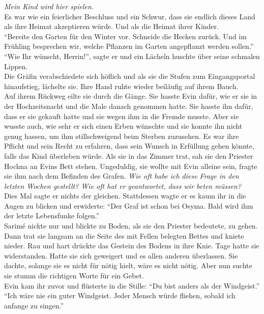 \textit{Mein Kind wird hier spielen.}\\
Es war wie ein feierlicher Beschluss und ein Schwur, dass sie endlich dieses Land als ihre Heimat 
akzeptieren würde. Und als die Heimat ihrer Kinder.\\
``Bereite den Garten für den Winter vor. Schneide die Hecken zurück. Und im Frühling besprechen 
wir, welche Pflanzen im Garten angepflanzt werden sollen.''\\
``Wie Ihr wünscht, Herrin!'', sagte er und ein Lächeln huschte über seine schmalen Lippen.\\
Die Gräfin verabschiedete sich höflich und als sie die Stufen zum Eingangsportal hinaufstieg, 
lächelte sie. Ihre Hand ruhte wieder beiläufig auf ihrem Bauch. \\

Auf ihrem Rückweg eilte sie durch die Gänge. Sie hasste Evin dafür, wie er sie in der 
Hochzeitsnacht und die Male danach genommen hatte. Sie hasste ihn dafür, dass er sie gekauft hatte 
und sie wegen ihm in die Fremde musste. Aber sie wusste auch, wie sehr er sich einen Erben wünschte 
und sie konnte ihn nicht genug hassen, um ihm stillschweigend beim Sterben zuzusehen. Es war ihre 
Pflicht und sein Recht zu erfahren, dass sein Wunsch in Erfüllung gehen könnte, falls das Kind 
überleben würde. Als sie in das Zimmer trat, sah sie den Priester Hochna an Evins Bett stehen. 
Ungeduldig, sie wollte mit Evin alleine sein, fragte sie ihm nach dem Befinden des Grafen. 
\textit{Wie oft habe ich diese Frage in den letzten Wochen gestellt? Wie oft hat er geantwortet, 
dass wir beten müssen?}\\
Dies Mal sagte er nichts der gleichen. Stattdessen wagte er es kaum ihr in die Augen zu blicken und 
erwiderte: ``Der Graf ist schon bei Osyma. Bald wird ihm der letzte Lebensfunke folgen.''\\
Sarimé nickte nur und blickte zu Boden, als sie den Priester bedeutete, zu gehen. Dann trat sie 
langsam an die Seite des mit Fellen belegten Bettes und kniete nieder. Rau und hart drückte das 
Gestein des Bodens in ihre Knie. Tage hatte sie widerstanden. Hatte sie sich geweigert und es allen 
anderen überlassen. Sie dachte, solange sie es nicht für nötig hielt, wäre es nicht nötig. Aber nun 
suchte sie stumm die richtigen Worte für ein Gebet.\\
Evin kam ihr zuvor und flüsterte in die Stille: ``Du bist anders als der Windgeist.''\\
``Ich wäre nie ein guter Windgeist. Jeder Mensch würde fliehen, sobald ich anfange zu singen.''\\
